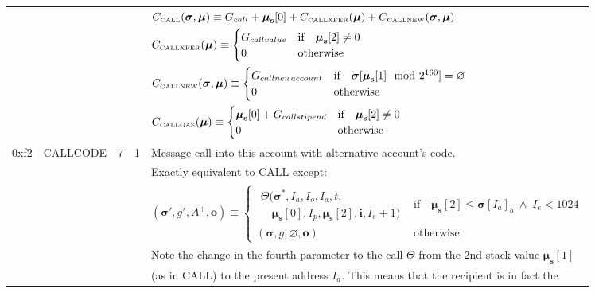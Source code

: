 \documentclass[9pt,oneside]{amsart}
\begin{document}
\begin{tabular*}{\columnwidth}[h]{rlrrl}
&&&& $C_{\text{\tiny CALL}}(\boldsymbol{\sigma}, \boldsymbol{\mu}) \equiv G_{call} + \boldsymbol{\mu}_\mathbf{s}[0] + C_{\text{\tiny CALLXFER}}(\boldsymbol{\mu}) + C_{\text{\tiny CALLNEW}}(\boldsymbol{\sigma}, \boldsymbol{\mu})$ \\
&&&& $C_{\text{\tiny CALLXFER}}(\boldsymbol{\mu}) \equiv \begin{cases}
G_{callvalue} & \text{if} \quad \boldsymbol{\mu}_\mathbf{s}[2] \neq 0 \\
0 & \text{otherwise}
\end{cases}$ \\
&&&& $C_{\text{\tiny CALLNEW}}(\boldsymbol{\sigma}, \boldsymbol{\mu}) \equiv \begin{cases}
G_{callnewaccount} & \text{if} \quad \boldsymbol{\sigma}[\boldsymbol{\mu}_\mathbf{s}[1] \mod 2^{160}] = \varnothing \\
0 & \text{otherwise}
\end{cases}$ \\
&&&& $C_{\text{\tiny CALLGAS}}(\boldsymbol{\mu}) \equiv  \begin{cases}
\boldsymbol{\mu}_\mathbf{s}[0] + G_{callstipend} & \text{if} \quad \boldsymbol{\mu}_\mathbf{s}[2] \neq 0 \\
0 & \text{otherwise}
\end{cases}$ \\
\midrule
0xf2 & {\small CALLCODE} & 7 & 1 & Message-call into this account with alternative account's code. \\
&&&& Exactly equivalent to {\small CALL} except: \\
&&&& $(\boldsymbol{\sigma}', g', A^+, \mathbf{o}) \equiv \begin{cases}\begin{array}{l}\Theta(\boldsymbol{\sigma}^*, I_a, I_o, I_a, t,\\\quad \boldsymbol{\mu}_\mathbf{s}[0], I_p, \boldsymbol{\mu}_\mathbf{s}[2], \mathbf{i}, I_e + 1)\end{array} & \text{if} \quad \boldsymbol{\mu}_\mathbf{s}[2] \leqslant \boldsymbol{\sigma}[I_a]_b \;\wedge\; I_e < 1024 \\ (\boldsymbol{\sigma}, g, \varnothing, \mathbf{o}) & \text{otherwise} \end{cases}$ \\
&&&& Note the change in the fourth parameter to the call $\Theta$ from the 2nd stack value $\boldsymbol{\mu}_\mathbf{s}[1]$\\
&&&& (as in {\small CALL}) to the present address $I_a$. This means that the recipient is in fact the\\

\end{tabular*}
\end{document}
